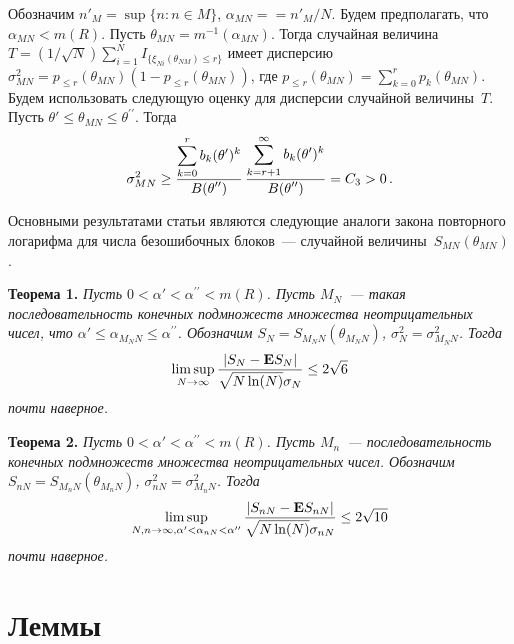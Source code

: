 \begin{multicols}{2}
Обозначим $n'_M=\sup\{n: n\in M\}$, $\alpha_{MN}=$\linebreak $={n'_M}/{N}$. Будем
предполагать, что $\alpha_{MN}<m(R)$. Пусть
$\theta_{MN}=m^{-1}(\alpha_{MN})$. Тогда случайная величина
$T=(1/\sqrt{N})\sum\limits_{i=1}^NI_{\{\xi_{Ni}(\theta_{NM})\le r\}}$
имеет дисперсию $\sigma^2_{MN}=p_{\le r}(\theta_{MN})(1-p_{\le
r}(\theta_{MN}))$, где $p_{\le
r}(\theta_{MN})=\sum\limits_{k=0}^rp_{k}(\theta_{MN})$. Будем использовать
следующую оценку для дисперсии случайной величины~$T$. Пусть
$\theta'\le\theta_{MN}\le\theta^{\prime\prime}$. Тогда
\begin{equation}
\sigma^2_{MN}\ge \displaystyle\frac{\displaystyle \sum_{k=0}^rb_k(\theta')^k\mathstrut}{\displaystyle B(\theta^{\prime\prime})\mathstrut}
\,
\displaystyle\frac{\displaystyle \sum_{k=r+1}^{\infty}b_k(\theta')^k\mathstrut}{\displaystyle B(\theta^{\prime\prime})\mathstrut}=C_3>0\,.
\label{e1.3faz}
\end{equation}

Основными результатами статьи являются следующие аналоги закона
повторного логарифма для числа безошибочных блоков~--- случайной
величины~$S_{MN}(\theta_{MN})$.

\medskip

\noindent

\textbf{Теорема 1.} {\it  Пусть  $0<\alpha'< \alpha^{\prime\prime}<m(R)$. Пусть
$M_N$~--- такая последовательность конечных подмножеств множества
неотрицательных чисел, что $\alpha'\le\alpha_{M_NN}\le\alpha^{\prime\prime}$.
Обозначим $S_{N}=S_{M_NN}(\theta_{M_NN})$, $\sigma^2_N=
\sigma^2_{M_NN}$. Тогда
\begin{equation}
\limsup_{N\to\infty}\displaystyle\frac{\displaystyle |S_N-{{\bf E}}S_N|\mathstrut}{\displaystyle \sqrt{N\ln(N)}\sigma_N\mathstrut}\le
2\sqrt{6} 
\label{e1.4faz}
\end{equation}
почти наверное. }

\medskip

\noindent

\textbf{Теорема 2.} {\it Пусть  $0<\alpha'< \alpha^{\prime\prime}<m(R)$. Пусть
$M_n$~---  последовательность конечных подмножеств множества
неотрицательных чисел.  Обозначим $S_{nN}=S_{M_nN}(\theta_{M_nN})$,
$\sigma^2_{nN}= \sigma^2_{M_nN}$.  Тогда
\begin{equation}
\limsup_{N,n\to\infty,\alpha'<\alpha_{nN}< \alpha^{\prime\prime}
 }
\displaystyle\frac{\displaystyle |S_{nN}-{{\bf E}}S_{nN} |\mathstrut}{\displaystyle \sqrt{N\ln(N)}\sigma_{nN}\mathstrut}
 \le 2\sqrt{10}
\label{e1.5faz}
\end{equation}
почти наверное. }



\section{Леммы}


\end{multicols}

